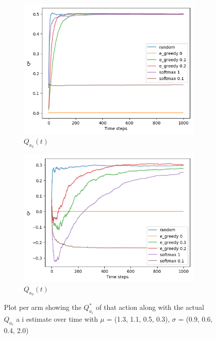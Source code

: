 \documentclass[letterpaper]{article}
\begin{document}
\begin{figure}[H]
\begin{subfigure}{.5\textwidth}
    \includegraphics[width=1\linewidth]{images/assign3/ex1/qta_2}
    \caption{$Q_{a_{2}}(t)$}
    \label{fig:qta_2_ex1}
  \end{subfigure}
  \begin{subfigure}{.5\textwidth}
    \centering
    \includegraphics[width=1\linewidth]{images/assign3/ex1/qta_3}
    \caption{$Q_{a_{3}}(t)$}
    \label{fig:qta_3_ex1}
  \end{subfigure}

    \caption{Plot per arm showing
    the $Q^{*}_{a_{i}}$
    of that action along with the actual $Q_{a_{i}}$ a i estimate over time
    with
    $\mu$ = (1.3, 1.1, 0.5, 0.3), $\sigma$ = (0.9, 0.6, 0.4, 2.0)}
    \label{fig:qtas_ex1}
\end{figure}
\end{document}
